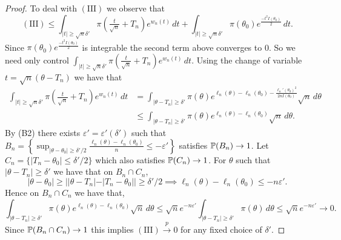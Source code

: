 \begin{proof}
  	\bigskip \noindent To deal with $(\text{III})$ we observe that \[
  		(\text{III}) \leq \int_{|t| \geq \sqrt{n}\delta'} \pi\left(\tfrac{t}{\sqrt{n}} + T_n \right) e^{w_n(t)} \, dt + \int_{|t| \geq \sqrt{n}\delta'} \pi(\theta_0) e^{\frac{-t^2 I(\theta_0)}{2}} \, dt.
  	\] Since $\pi(\theta_0) e^{\frac{-t^2 I(\theta_0)}{2}}$ is integrable the second term above converges to 0. So we need only control $\int_{|t| \geq \sqrt{n}\delta'} \pi\left(\tfrac{t}{\sqrt{n}} + T_n \right) e^{w_n(t)} \, dt$. Using the change of variable $t = \sqrt{n}(\theta - T_n)$ we have that \begin{align*}
  		\int_{|t| \geq \sqrt{n}\delta'} \pi\left(\tfrac{t}{\sqrt{n}} + T_n \right) e^{w_n(t)} \, dt &= \int_{|\theta - T_n| \geq \delta'} \pi\left(\theta \right) e^{\ell_n(\theta) - \ell_n(\theta_0) - \frac{\ell_n'(\theta_0)^2}{2n I(\theta_0)}} \sqrt{n} \, d\theta \\
  		&\leq \int_{|\theta - T_n| \geq \delta'} \pi\left(\theta \right) e^{\ell_n(\theta) - \ell_n(\theta_0)} \sqrt{n} \, d\theta. 
  	\end{align*}
  	By (B2) there exists $\varepsilon' = \varepsilon'(\delta')$ such that $B_n = \left\{\sup_{|\theta - \theta_0| \geq \delta'/2} \frac{\ell_n(\theta) - \ell_n(\theta_0)}{n} \leq -\varepsilon' \right\}$ satisfies $\mathbb{P}(B_n) \to 1$. Let $C_n = \{|T_n - \theta_0| \leq \delta'/2\}$ which also satisfies $\mathbb{P}(C_n) \to 1$. For $\theta$ such that $|\theta - T_n| \geq \delta'$ we have that on $B_n \cap C_n$, \[
  		|\theta - \theta_0| \geq ||\theta - T_n| - |T_n - \theta_0|| \geq \delta'/2 \implies \ell_n(\theta) - \ell_n(\theta_0) \leq -n\varepsilon'.
  	\] Hence on $B_n \cap C_n$ we have that, \[
  	 \int_{|\theta - T_n| \geq \delta'} \pi\left(\theta \right) e^{\ell_n(\theta) - \ell_n(\theta_0)} \sqrt{n} \, d\theta
  	\leq 
  	\sqrt{n} e^{-n\varepsilon'}  \int_{|\theta - T_n| \geq \delta'} \pi(\theta) \, d\theta \leq \sqrt{n} e^{-n\varepsilon'} \to 0.
  	\]
  	Since $\mathbb{P}(B_n \cap C_n) \to 1$ this implies $(\text{III}) \overset{p}{\to} 0$ for any fixed choice of $\delta'$. 
  	

\end{proof}
